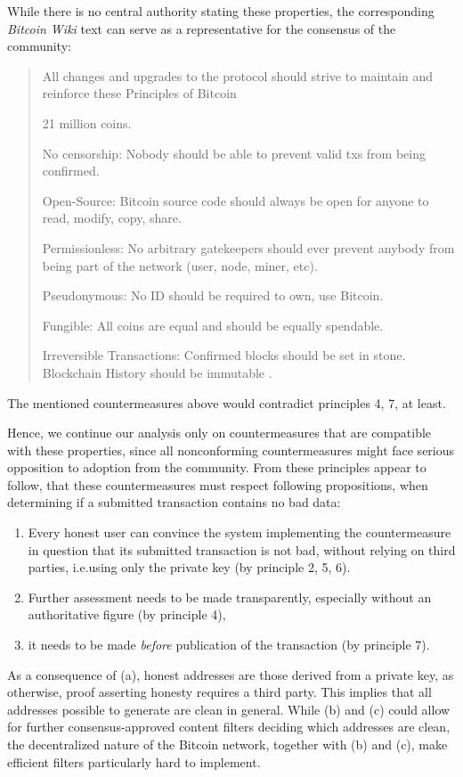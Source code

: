 \documentclass[a4paper,11pt,titlepage]{scrbook}
\begin{document}
While there is no central authority stating these properties, the corresponding \emph{Bitcoin Wiki} text can serve as a representative for the consensus of the community:
\begin{quote}
    \noindent\textooquote
    All changes and upgrades to the protocol should strive to maintain and reinforce these Principles of Bitcoin

    \begin{enumerate}[label={[}\arabic*.{]}]
        \item 21 million coins.
        \item No censorship: Nobody should be able to prevent valid txs from being confirmed.
        \item Open-Source: Bitcoin source code should always be open for anyone to read, modify, copy, share.
        \item Permissionless: No arbitrary gatekeepers should ever prevent anybody from being part of the network (user, node, miner, etc).
        \item Pseudonymous: No ID should be required to own, use Bitcoin.
        \item Fungible: All coins are equal and should be equally spendable.
        \item Irreversible Transactions: Confirmed blocks should be set in stone. Blockchain History should be immutable\textcoquote{} \cite{bitcoinwiki_principles_2017}.
    \end{enumerate}
\end{quote}
The mentioned countermeasures above would contradict principles 4, 7, at least.

Hence, we continue our analysis only on countermeasures that are compatible with these properties, since all nonconforming countermeasures might face serious opposition to adoption from the community.
From these principles appear to follow, that these countermeasures must respect following propositions, when determining if a submitted transaction contains no bad data:
\begin{enumerate}
    \item Every honest user can convince the system implementing the countermeasure in question that its submitted transaction is not bad, without relying on third parties, i.e.\@ using only the private key (by principle 2, 5, 6).
    \item Further assessment needs to be made transparently, especially without an authoritative figure (by principle 4),
    \item it needs to be made \emph{before} publication of the transaction (by principle 7).
\end{enumerate}
As a consequence of (a), honest addresses are those derived from a private key, as otherwise, proof asserting honesty requires a third party.
This implies that all addresses possible to generate are clean in general.
While (b) and (c) could allow for further consensus-approved content filters deciding which addresses are clean, the decentralized nature of the Bitcoin network, together with (b) and (c), make efficient filters particularly hard to implement.
\end{document}
